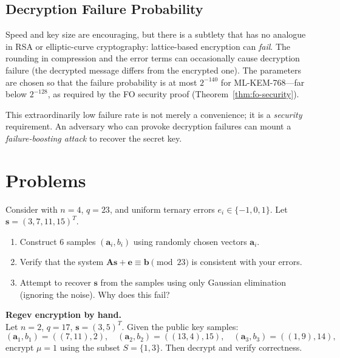 \subsection{Decryption Failure Probability}
\label{subsec:failure-prob}

Speed and key size are encouraging, but there is a subtlety that has no analogue in RSA or elliptic-curve cryptography: lattice-based encryption can \emph{fail}.  The rounding in compression and the error terms can occasionally cause decryption failure (the decrypted message differs from the encrypted one).  The parameters are chosen so that the failure probability is at most $2^{-140}$ for ML-KEM-768---far below $2^{-128}$, as required by the FO security proof (Theorem~\ref{thm:fo-security}).

This extraordinarily low failure rate is not merely a convenience; it is a \emph{security} requirement.  An adversary who can provoke decryption failures can mount a \emph{failure-boosting attack} to recover the secret key.


\section*{Problems}

\begin{prob}
\label{prob:ch07-lwe-instance}
Consider \lwe{} with $n = 4$, $q = 23$, and uniform ternary errors $e_i \in \{-1, 0, 1\}$.  Let $\mathbf{s} = (3, 7, 11, 15)^T$.
\begin{enumerate}
\item[(a)] Construct 6 \lwe{} samples $(\mathbf{a}_i, b_i)$ using randomly chosen vectors $\mathbf{a}_i$.
\item[(b)] Verify that the system $\mathbf{A}\mathbf{s} + \mathbf{e} \equiv \mathbf{b} \pmod{23}$ is consistent with your errors.
\item[(c)] Attempt to recover $\mathbf{s}$ from the samples using only Gaussian elimination (ignoring the noise).  Why does this fail?
\end{enumerate}
\end{prob}

\begin{prob}
\label{prob:ch07-regev-enc}
\textbf{Regev encryption by hand.}\\
Let $n = 2$, $q = 17$, $\mathbf{s} = (3, 5)^T$.  Given the public key samples:
\[
(\mathbf{a}_1, b_1) = ((7, 11), 2),\quad
(\mathbf{a}_2, b_2) = ((13, 4), 15),\quad
(\mathbf{a}_3, b_3) = ((1, 9), 14),
\]
encrypt $\mu = 1$ using the subset $S = \{1, 3\}$.  Then decrypt and verify correctness.
\end{prob}

